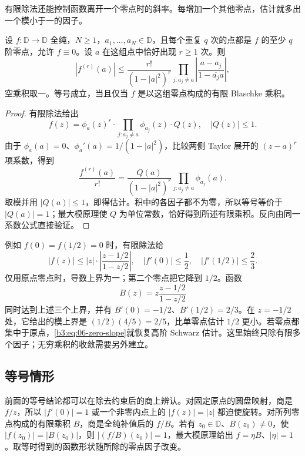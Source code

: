 \ProseParagraphBreak

有限除法还能控制函数离开一个零点时的斜率。每增加一个其他零点，估计就多出一个模小于一的因子。

\begin{corollary}[指定零点处的导数界]\label{b3:cor:06-zero-slope}
设 \(f:\mathbb D\to\mathbb D\) 全纯，\(N\ge1\)，\(a_1,\ldots,a_N\in\mathbb D\)，且每个重复 \(q\) 次的点都是 \(f\) 的至少 \(q\) 阶零点，允许 \(f\equiv0\)。设 \(a\) 在这组点中恰好出现 \(r\ge1\) 次。则
\begin{equation}\label{b3:eq:06-zero-slope}
 |f^{(r)}(a)|
 \le\frac{r!}{(1-|a|^2)^r}
       \prod_{j:a_j\ne a}\left|\frac{a-a_j}{1-\overline{a_j}a}\right|,
\end{equation}
空乘积取一。等号成立，当且仅当 \(f\) 是以这组零点构成的有限 Blaschke 乘积。
\end{corollary}
\begin{proof}
有限除法给出
\[
 f(z)=\phi_a(z)^r\cdot
       \prod_{j:a_j\ne a}\phi_{a_j}(z)\cdot Q(z),
 \quad |Q(z)|\le1.
\]
由于 \(\phi_a(a)=0\)、\(\phi_a'(a)=1/(1-|a|^2)\)，比较两侧 Taylor 展开的 \((z-a)^r\) 项系数，得到
\[
 \frac{f^{(r)}(a)}{r!}
 =\frac{Q(a)}{(1-|a|^2)^r}
       \prod_{j:a_j\ne a}\phi_{a_j}(a).
\]
取模并用 \(|Q(a)|\le1\)，即得估计。积中的各因子都不为零，所以等号等价于 \(|Q(a)|=1\)；最大模原理使 \(Q\) 为单位常数，恰好得到所述有限乘积。反向由同一系数公式直接验证。
\end{proof}

例如 \(f(0)=f(1/2)=0\) 时，有限除法给
\[
 |f(z)|\le |z|\cdot\left|\frac{z-1/2}{1-z/2}\right|,
 \quad |f'(0)|\le\frac12,
 \quad |f'(1/2)|\le\frac23.
\]
仅用原点零点时，导数上界为一；第二个零点把它降到 \(1/2\)。函数
\[
 B(z)=z\frac{z-1/2}{1-z/2}
\]
同时达到上述三个上界，并有 \(B'(0)=-1/2\)、\(B'(1/2)=2/3\)。在 \(z=-1/2\) 处，它给出的模上界是 \((1/2)(4/5)=2/5\)，比单零点估计 \(1/2\) 更小。若零点都集中于原点，\eqref{b3:eq:06-zero-slope}就恢复高阶 Schwarz 估计。这里始终只除有限多个因子；无穷乘积的收敛需要另外建立。

\subsection{等号情形}
\label{b3:subsec:060103}

前面的等号结论都可以在除去约束后的商上辨认。对固定原点的圆盘映射，商是 \(f/z\)，所以 \(|f'(0)|=1\) 或一个非零内点上的 \(|f(z)|=|z|\) 都迫使旋转。对所列零点构成的有限乘积 \(B\)，商是全纯补值后的 \(f/B\)。若有 \(z_0\in\mathbb D\)、\(B(z_0)\ne0\)，使 \(|f(z_0)|=|B(z_0)|\)，则 \(|(f/B)(z_0)|=1\)，最大模原理给出 \(f=\eta B\)、\(|\eta|=1\)。取等时得到的函数形状随所除的零点因子改变。

